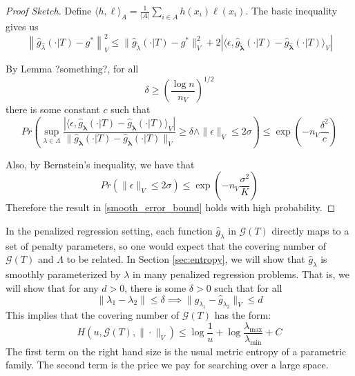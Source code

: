 \documentclass[12pt]{article}
\begin{document}
\begin{proof}[Proof Sketch]
Define $\langle h, \ell \rangle_A = \frac{1}{|A|}\sum_{i\in A} h(x_i) \ell(x_i)$. 
The basic inequality gives us
\begin{equation}
\left \|\hat{g}_{\hat{\lambda} }(\cdot | T) - g^* \right \|_V^2
\le
\| \hat{g}_{\tilde{\lambda}}(\cdot | T) - g^*\|_V^2 + 
2 \left | \langle \epsilon, \hat{g}_{\tilde{\boldsymbol \lambda}}(\cdot | T) - \hat{g}_{\hat{\boldsymbol \lambda}}(\cdot | T) \rangle_V \right |
\end{equation}

By Lemma ?something?, for all
\begin{equation}
\delta \ge \left ( \frac{\log n}{n_V} \right )^{1/2}
\end{equation}
there is some constant $c$ such that
\begin{equation}
Pr \left (
\sup_{\lambda \in \Lambda}
\frac {\left | \langle \epsilon, \hat{g}_{\boldsymbol \lambda}(\cdot | T) - \hat{g}_{\boldsymbol \lambda}(\cdot | T) \rangle_V \right |}{\| \hat{g}_{\boldsymbol \lambda}(\cdot | T) - \hat{g}_{\boldsymbol \lambda}(\cdot | T) \|_V}
\ge \delta 
\wedge
\| \epsilon \|_V \le 2 \sigma
\right ) 
\le \exp \left ( - n_V \frac{\delta^2}{c} \right )
\end{equation}

Also, by Bernstein's inequality, we have that
\begin{equation}
Pr \left ( \| \epsilon \|_V \le 2 \sigma \right ) 
\le
\exp \left ( - n_V \frac{\sigma^2}{K} \right )
\end{equation}
Therefore the result in \eqref{smooth_error_bound} holds with high probability.
\end{proof}

In the penalized regression setting, each function $\hat{g}_\lambda$ in $\mathcal{G}(T)$ directly maps to a set of penalty parameters, so one would expect that the covering number of $\mathcal{G}(T)$ and $\Lambda$ to be related. In Section \ref{sec:entropy}, we will show that $\hat{g}_\lambda$ is smoothly parameterized by $\lambda$ in many penalized regression problems. That is, we will show that for any $d> 0$, there is some $\delta > 0$ such that for all
\begin{equation}
\label{fit_func_smooth}
\| \lambda_1 - \lambda_2 \| \le \delta \implies \| \hat{g}_{\lambda_1} - \hat{g}_{\lambda_2} \|_V \le d
\end{equation}
This implies that the covering number of $\mathcal{G}(T)$ has the form:
\begin{equation}
\label{entropy_bound}
H(u, \mathcal{G}(T), \| \cdot \|_V) \le \log \frac{1}{u} + \log \frac{\lambda_{\max}}{\lambda_{\min}} + C
\end{equation}
The first term on the right hand size is the usual metric entropy of a parametric family. The second term is the price we pay for searching over a large space.
\end{document}
